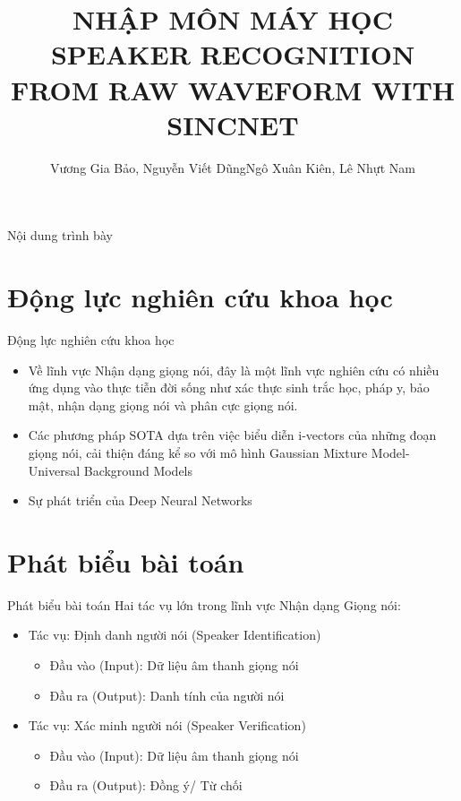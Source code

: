\documentclass[notheorems, aspectratio=54]{beamer}
\author{Vương Gia Bảo, Nguyễn Viết Dũng\newline Ngô Xuân Kiên, Lê Nhựt Nam}
\title{NHẬP MÔN MÁY HỌC \newline SPEAKER RECOGNITION FROM \newline RAW WAVEFORM WITH SINCNET}
\institute{Đại học Khoa học Tự nhiên, Đại học Quốc gia TP HCM}
\begin{document}
\begin{frame}
\titlepage
\end{frame}

\begin{frame}{Nội dung trình bày}
\tableofcontents
\end{frame}


\section{Động lực nghiên cứu khoa học}
\begin{frame}{Động lực nghiên cứu khoa học}
	\begin{itemize}
		\item Về lĩnh vực Nhận dạng giọng nói, đây là một lĩnh vực nghiên cứu có nhiều ứng dụng vào thực tiễn đời sống như xác thực sinh trắc học, pháp y, bảo mật, nhận dạng giọng nói và phân cực giọng nói.
		\item Các phương pháp SOTA dựa trên việc biểu diễn i-vectors của những đoạn
		giọng nói, cải thiện đáng kể so với mô hình Gaussian Mixture Model-Universal Background Models
		\item Sự phát triển của Deep Neural Networks
	\end{itemize}
\end{frame}

\section{Phát biểu bài toán}
\begin{frame}{Phát biểu bài toán}
	Hai tác vụ lớn trong lĩnh vực Nhận dạng Giọng nói:\newline
	\begin{itemize}
		\item Tác vụ: Định danh người nói (Speaker Identification)
		\begin{itemize}
			\item Đầu vào (Input): Dữ liệu âm thanh giọng nói
			\item Đầu ra (Output): Danh tính của người nói
		\end{itemize}
		\item 	Tác vụ: Xác minh người nói (Speaker Verification)
		\begin{itemize}
			\item Đầu vào (Input): Dữ liệu âm thanh giọng nói
			\item Đầu ra (Output): Đồng ý/ Từ chối
		\end{itemize}
	\end{itemize}
\end{frame}
\end{document}
